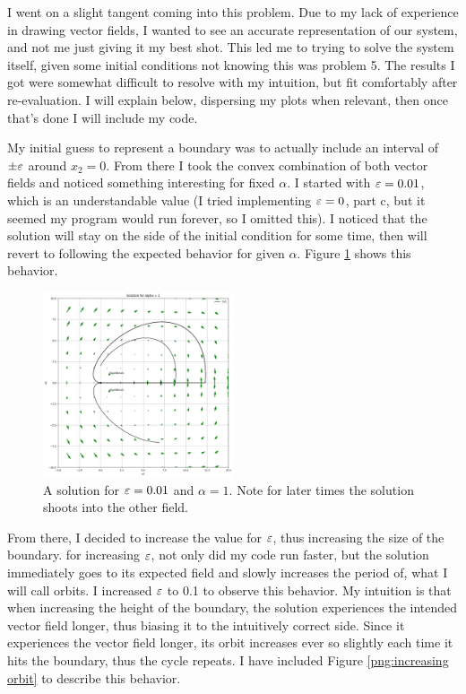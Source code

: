 \partbreak
\begin{solution}

    I went on a slight tangent coming into this problem. Due to my lack of experience in drawing vector fields, I wanted to see an accurate representation of our system, and not me just giving it my best shot. This led me to trying to solve the system itself, given some initial conditions not knowing this was problem 5. The results I got were somewhat difficult to resolve with my intuition, but fit comfortably after re-evaluation. I will explain below, dispersing my plots when relevant, then once that's done I will include my code.

    \jump
    My initial guess to represent a boundary was to actually include an interval of $\pm \varepsilon$ around $x_2 = 0$. From there I took the convex combination of both vector fields and noticed something interesting for fixed $\alpha$. I started with $\varepsilon = 0.01$, which is an understandable value (I tried implementing $\varepsilon = 0$, part c, but it seemed my program would run forever, so I omitted this). I noticed that the solution will stay on the side of the initial condition for some time, then will revert to following the expected behavior for given $\alpha$. Figure \ref{png:othervectorfield} shows this behavior.
    
    \jump
    \begin{figure}[!ht]
    \centering
    \includegraphics[width = 0.5\textwidth]{Images/small ep other vector field.png}
    \caption{A solution for $\varepsilon = 0.01$ and $\alpha = 1$. Note for later times the solution shoots into the other field.}
    \label{png:othervectorfield}
    \end{figure}
    
    
    \vspace{\floatsep}
    \clearpage

    From there, I decided to increase the value for $\varepsilon$, thus increasing the size of the boundary. for increasing $\varepsilon$, not only did my code run faster, but the solution immediately goes to its expected field and slowly increases the period of, what I will call orbits. I increased $\varepsilon$ to 0.1 to observe this behavior. My intuition is that when increasing the height of the boundary, the solution experiences the intended vector field longer, thus biasing it to the intuitively correct side. Since it experiences the vector field longer, its orbit increases ever so slightly each time it hits the boundary, thus the cycle repeats. I have included Figure \ref{png:increasing orbit} to describe this behavior.
    

\end{solution}
